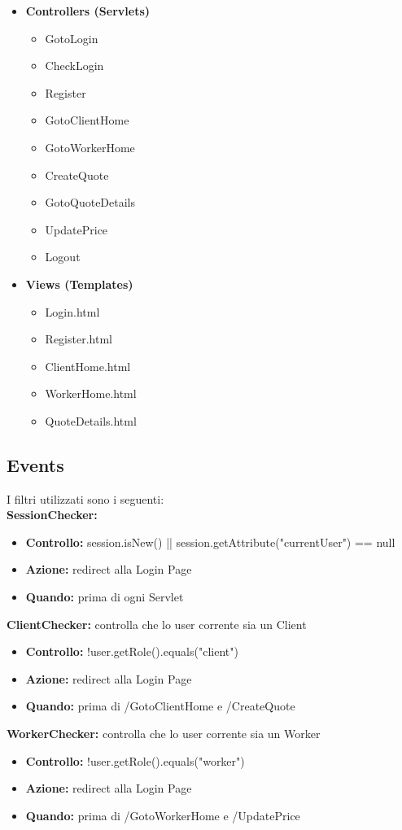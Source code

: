 \documentclass[a4paper, 12pt]{article}
\begin{document}
\begin{itemize}
\begin{itemize}
\begin{itemize}
	\end{itemize}
\end{itemize}
\item \textbf{Controllers (Servlets)}
\begin{itemize}
	\item GotoLogin
	\item CheckLogin
	\item Register
	\item GotoClientHome
	\item GotoWorkerHome
	\item CreateQuote
	\item GotoQuoteDetails
	\item UpdatePrice
	\item Logout
\end{itemize}
\item \textbf{Views (Templates)}
\begin{itemize}
\item Login.html
\item Register.html
\item ClientHome.html
\item WorkerHome.html
\item QuoteDetails.html
\end{itemize}
\end{itemize}

\subsection{Events}
I filtri utilizzati sono i seguenti:\\

\noindent \textbf{SessionChecker:}
\begin{itemize}
\item \textbf{Controllo:} session.isNew() || session.getAttribute("currentUser") == null 
\item \textbf{Azione:} redirect alla Login Page
\item \textbf{Quando:} prima di ogni Servlet
\end{itemize}
\textbf{ClientChecker:} controlla che lo user corrente sia un Client
\begin{itemize}
\item \textbf{Controllo:} !user.getRole().equals("client")
\item \textbf{Azione:} redirect alla Login Page
\item \textbf{Quando:} prima di /GotoClientHome e /CreateQuote
\end{itemize}
\textbf{WorkerChecker:} controlla che lo user corrente sia un Worker
\begin{itemize}
\item \textbf{Controllo:} !user.getRole().equals("worker")
\item \textbf{Azione:} redirect alla Login Page
\item \textbf{Quando:} prima di /GotoWorkerHome e /UpdatePrice
\end{itemize}
\newpage
\end{document}
